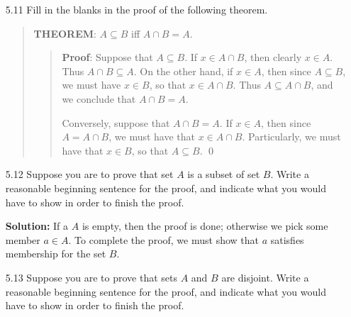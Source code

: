 \begin{enumerate}
\begin{quote}
\begin{quote}
                     Conversely, suppose that $A \cup B = B$. If $x \in A$, then
                     $x \in A \cup B$. But $A \cup B = B$, so $x \in B$. Thus
                     $A \subseteq B$. \qed
                  \end{quote}
               \end{quote}
   \item[5.11] Fill in the blanks in the proof of the following theorem.
               \begin{quote}
                  \textbf{THEOREM}: $A \subseteq B$ iff $A \cap B = A$.
                  \begin{quote}
                     \textbf{Proof}: Suppose that $A \subseteq B$. If
                     $x \in A \cap B$, then clearly $x \in A$. Thus
                     $A \cap B \subseteq A$. On the other hand, if $x \in A$,
                     then since $A \subseteq B$, we must have $x \in B$, so
                     that $x \in A \cap B$. Thus $A \subseteq A \cap B$, and we
                     conclude that $A \cap B = A$.
   
                     Conversely, suppose that $A \cap B = A$. If $x \in A$, then
                     since $A = A \cap B$, we must have that $x \in A \cap B$.
                     Particularly, we must have that $x \in B$, so that
                     $A \subseteq B$. \qed
                  \end{quote}
               \end{quote}
   \item[5.12] Suppose you are to prove that set $A$ is a subset of set $B$.
               Write a reasonable beginning sentence for the proof, and indicate
               what you would have to show in order to finish the proof.
               
      \textbf{Solution:} If a $A$ is empty, then the proof is done; otherwise we
      pick some member $a \in A$. To complete the proof, we must show that $a$
      satisfies membership for the set $B$.
   \item[5.13] Suppose you are to prove that sets $A$ and $B$ are disjoint.
               Write a reasonable beginning sentence for the proof, and indicate
               what you would have to show in order to finish the proof.
               

\end{enumerate}
